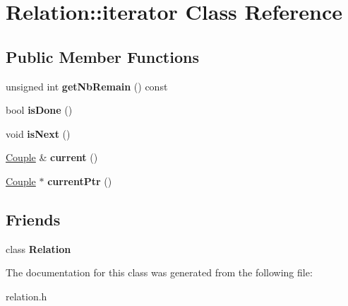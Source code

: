 \hypertarget{classRelation_1_1iterator}{}\section{Relation\+:\+:iterator Class Reference}
\label{classRelation_1_1iterator}
\subsection*{Public Member Functions}
\begin{DoxyCompactItemize}
\item 
\mbox{\label{classRelation_1_1iterator_ac273b4dfe3e36398ff00a6b9de4fbf10}} 
unsigned int {\bfseries get\+Nb\+Remain} () const
\item 
\mbox{\label{classRelation_1_1iterator_ab4c1267339e6e51aac7dcd02fb8094bc}} 
bool {\bfseries is\+Done} ()
\item 
\mbox{\label{classRelation_1_1iterator_ac5cb5920f12505f9b089a51b24c060ee}} 
void {\bfseries is\+Next} ()
\item 
\mbox{\label{classRelation_1_1iterator_a05e969f62d9163c45026eb0f96c8f5ce}} 
\hyperlink{classCouple}{Couple} \& {\bfseries current} ()
\item 
\mbox{\label{classRelation_1_1iterator_acc72a8430914ae30f0fba440d855aeec}} 
\hyperlink{classCouple}{Couple} $\ast$ {\bfseries current\+Ptr} ()
\end{DoxyCompactItemize}
\subsection*{Friends}
\begin{DoxyCompactItemize}
\item 
\mbox{\label{classRelation_1_1iterator_a7ee004262f27f8c916688911a71e3aa1}} 
class {\bfseries Relation}
\end{DoxyCompactItemize}


The documentation for this class was generated from the following file\+:\begin{DoxyCompactItemize}
\item 
relation.\+h\end{DoxyCompactItemize}
